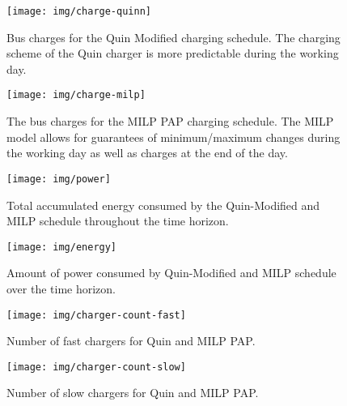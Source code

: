 \begin{subfigures}
    \begin{figure}[htpb]
    \centering
        \texttt{[image: img/charge-quinn]}
        \caption{Bus charges for the Quin Modified charging schedule. The charging scheme of the Quin charger is more predictable during the working day.}
        \label{subfig:quin-charge}
    \end{figure}

    \hfill

    \begin{figure}[htpb]
    \centering
        \texttt{[image: img/charge-milp]}
        \caption{The bus charges for the MILP PAP charging schedule. The MILP model allows for guarantees of minimum/maximum changes during the working day as well as charges at the end of the day.}
        \label{subfig:milp-charge}
    \end{figure}
\end{subfigures}

\begin{figure}[htpb]
\centering
    \texttt{[image: img/power]}
    \caption{Total accumulated energy consumed by the Quin-Modified and MILP schedule throughout the time horizon.}
    \label{fig:power-usage}
\end{figure}

\begin{figure}[htpb]
\centering
    \texttt{[image: img/energy]}
    \caption{Amount of power consumed by Quin-Modified and MILP schedule over the time horizon.}
    \label{fig:energy-usage}
\end{figure}

\begin{subfigures}
    \begin{figure}[htpb]
    \centering
        \texttt{[image: img/charger-count-fast]}
        \caption{Number of fast chargers for Quin and MILP PAP.}
        \label{subfig:fast-charger-usage}
    \end{figure}

    \hfill

    \begin{figure}[!ht]
    \centering
        \texttt{[image: img/charger-count-slow]}
        \caption{Number of slow chargers for Quin and MILP PAP.}
        \label{subfig:slow-charger-usage}
    \end{figure}
\end{subfigures}

